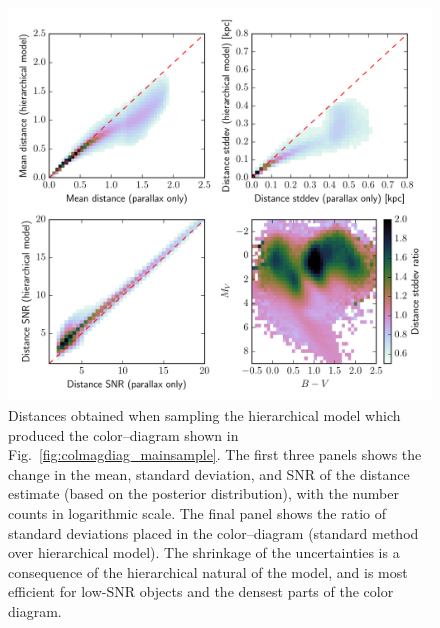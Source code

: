 \documentclass[manuscript, letterpaper]{aastex6}
\newcommand{\figref}[1]{{\xspace}Fig.~\ref{#1}}
\begin{document}
\begin{figure}
\hspace*{-3mm}\includegraphics[width=15.5cm]{colmagdiag_mainsample_dist.pdf}
\caption{Distances obtained when sampling the hierarchical model which produced the color--diagram shown in \figref{fig:colmagdiag_mainsample}. 
The first three panels shows the change in the mean, standard deviation, and SNR of the distance estimate (based on the posterior distribution), with the number counts in logarithmic scale. The final panel shows the ratio of standard deviations placed in the color--diagram (standard method over hierarchical model). The shrinkage of the uncertainties is a consequence of the hierarchical natural of the model, and is most efficient for low-SNR objects and the densest parts of the color diagram.}
\label{fig:colmagdiag_mainsample_dist}
\end{figure}
\end{document}

